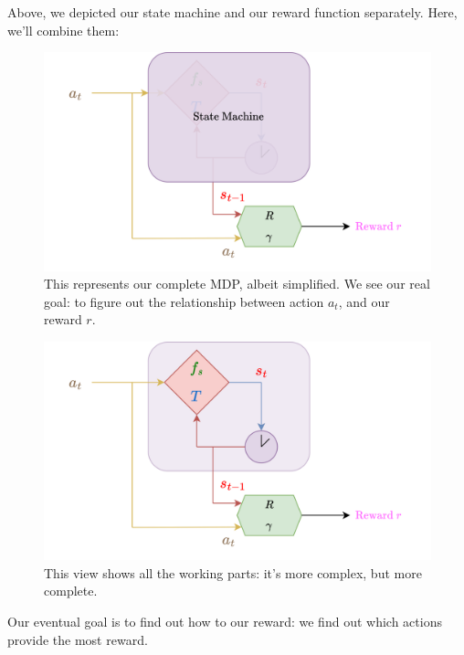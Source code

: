         Above, we depicted our state machine and our reward function separately. Here, we'll combine them:\\

        \begin{figure}[H]
            \centering
            \includegraphics[width=120mm,scale=0.5]{images/mdp_images/mdp_opaque.png}
            
            \caption*{This represents our complete MDP, albeit simplified. We see our real goal: to figure out the relationship between action $a_t$, and our reward $r$.}
        \end{figure}

        \begin{figure}[H]
            \centering
            \includegraphics[width=120mm,scale=0.5]{images/mdp_images/mdp_transparent.png}
            
            \caption*{This view shows all the working parts: it's more complex, but more complete.}
        \end{figure}

        Our eventual goal is to find out how to  our reward: we find out which actions provide the most reward.

